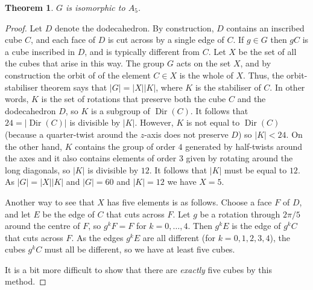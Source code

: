 \documentclass{amsart}
\DeclareMathOperator{\Dir}      {Dir}
\renewcommand{\:}{\colon}
\newtheorem{theorem}{Theorem}[section]
\theoremstyle{definition}
\begin{document}
\begin{theorem}
 $G$ is isomorphic to $A_5$.
\end{theorem}
\begin{proof}
 Let $D$ denote the dodecahedron.  By construction, $D$ contains an
 inscribed cube $C$, and each face of $D$ is cut across by a single
 edge of $C$.  If $g\in G$ then $gC$ is a cube inscribed in $D$, and
 is typically different from $C$.  Let $X$ be the set of all the cubes
 that arise in this way.  The group $G$ acts on the set $X$, and by
 construction the orbit of of the element $C\in X$ is the whole of
 $X$.  Thus, the orbit-stabiliser theorem says that $|G|=|X||K|$, where
 $K$ is the stabiliser of $C$.  In other words, $K$ is the set of
 rotations that preserve both the cube $C$ and the dodecahedron $D$,
 so $K$ is a subgroup of $\Dir(C)$.  It follows that $24=|\Dir(C)|$ is
 divisible by $|K|$.  However, $K$ is not equal to $\Dir(C)$ (because
 a quarter-twist around the $z$-axis does not preserve $D$) so
 $|K|<24$.  On the other hand, $K$ contains the group of order
 $4$ generated by half-twists around the axes and it also contains
 elements of order $3$ given by rotating around the long diagonals, so
 $|K|$ is divisible by $12$.  It follows that $|K|$ must be equal to
 $12$.  As $|G|=|X||K|$ and $|G|=60$ and $|K|=12$ we have $X=5$.

 Another way to see that $X$ has five elements is as follows.  Choose
 a face $F$ of $D$, and let $E$ be the edge of $C$ that cuts across
 $F$.  Let $g$ be a rotation through $2\pi/5$ around the centre of
 $F$, so $g^kF=F$ for $k=0,\ldots,4$.  Then $g^kE$ is the edge of
 $g^kC$ that cuts across $F$.  As the edges $g^kE$ are all different
 (for $k=0,1,2,3,4$), the cubes $g^kC$ must all be different, so we
 have at least five cubes.
 \begin{center}
 \end{center}
 It is a bit more difficult to show that there are \emph{exactly} five
 cubes by this method.


\end{proof}
\end{document}
